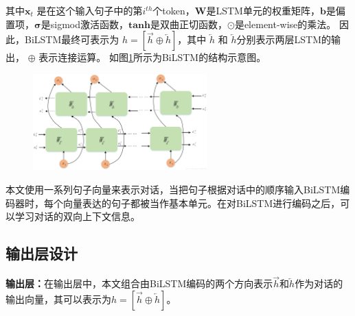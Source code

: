 其中$\mathbf{x}_{t}$ 是在这个输入句子中的第$i^{th}$个token，$\mathbf{W}$是LSTM单元的权重矩阵，$\mathbf{b}$是偏置项，$\mathbf{\sigma}$是sigmod激活函数，$\mathbf{tanh}$是双曲正切函数，$\odot$是element-wise的乘法。
因此，BiLSTM最终可表示为 $h=[\overrightarrow{h}\oplus \overleftarrow{h}]$，其中 $ \overleftarrow{h}$ 和  $ \overleftarrow{h}$分别表示两层LSTM的输出， $\oplus$ 表示连接运算。
如图\ref{fig:bilstm}所示为BiLSTM的结构示意图。
\begin{figure}[htb]
    \centering
    \includegraphics[width=0.6\textwidth]{Img/bilstm.jpg}
    \label{fig:bilstm}
\end{figure}
本文使用一系列句子向量来表示对话，当把句子根据对话中的顺序输入BiLSTM编码器时，每个向量表达的句子都被当作基本单元。在对BiLSTM进行编码之后，可以学习对话的双向上下文信息。

\subsection{输出层设计}
\textbf{输出层：}在输出层中，本文组合由BiLSTM编码的两个方向表示$\overrightarrow{h}$和$\overleftarrow{h}$作为对话的输出向量，其可以表示为$h=[\overrightarrow{h}\oplus \overleftarrow{h}]$。



